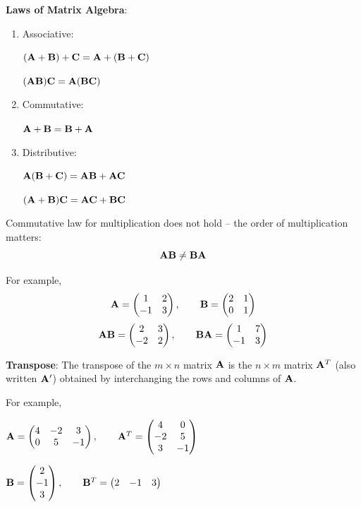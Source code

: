 \documentclass[]{book}
\theoremstyle{definition}
\theoremstyle{definition}
\theoremstyle{definition}
\theoremstyle{remark}
\begin{document}
\textbf{Laws of Matrix Algebra}:

\begin{enumerate}
        \item \parbox[t]{1.5in}{Associative:} $\bf (A+B)+C = A+(B+C)$\\
            \parbox[t]{1.5in}{\quad}  $\bf (AB)C = A(BC)$
        \item \parbox[t]{1.5in}{Commutative:} $\bf A+B=B+A$
        \item \parbox[t]{1.5in}{Distributive:} $\bf A(B+C)=AB+AC$\\
            \parbox[t]{1.5in}{\quad}   $\bf (A+B)C=AC+BC$
\end{enumerate}

Commutative law for multiplication does not hold -- the order of
multiplication matters: \[\bf AB\ne BA\]

For example,
\[{\bf A}=\begin{pmatrix} 1&2\\-1&3\end{pmatrix}, \qquad {\bf B}=\begin{pmatrix} 2&1\\0&1\end{pmatrix}\]
\[{\bf AB}=\begin{pmatrix} 2&3\\-2&2\end{pmatrix}, \qquad {\bf BA}=\begin{pmatrix} 1&7\\-1&3\end{pmatrix}\]

\textbf{Transpose}: The transpose of the \(m\times n\) matrix \(\bf A\)
is the \(n\times m\) matrix \({\bf A}^T\) (also written \({\bf A}'\))
obtained by interchanging the rows and columns of \(\bf A\).

For example,

\({\bf A}=\begin{pmatrix} 4&-2&3\\0&5&-1\end{pmatrix}, \qquad {\bf A}^T=\begin{pmatrix} 4&0\\-2&5\\3&-1 \end{pmatrix}\)

\({\bf B}=\begin{pmatrix} 2\\-1\\3 \end{pmatrix}, \qquad {\bf B}^T=\begin{pmatrix} 2&-1&3\end{pmatrix}\)
\end{document}
